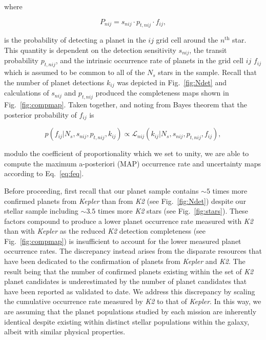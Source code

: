 \documentclass[twocolumn]{emulateapj}
\newcommand{\kepler}[1]{\emph{Kepler}#1}
\newcommand{\ktwo}[1]{\emph{K2}#1}
\begin{document}
\noindent where

\begin{equation}
  P_{nij} = s_{nij} \cdot p_{t,nij} \cdot f_{ij},
  \label{eq:prob}
\end{equation}

\noindent is the probability of detecting a planet in the $ij$ grid cell around the $n^{\text{th}}$ star.
This quantity is dependent on the detection sensitivity $s_{nij}$, the transit probability $p_{t,nij}$, and the 
intrinsic occurrence rate of planets in the grid cell $ij$ $f_{ij}$ which is assumed to be common to all
of the $N_s$ stars in the sample.
Recall that the number of planet detections $k_{ij}$ was depicted in Fig.~\ref{fig:Ndet} and
calculations of $s_{nij}$ and $p_{t,nij}$ produced the completeness maps shown in Fig.~\ref{fig:compmap}. 
Taken together, and noting from Bayes theorem that the posterior probability of $f_{ij}$ is 

\begin{equation}
  p(f_{ij}|N_s,s_{nij},p_{t,nij},k_{ij}) \propto \mathcal{L}_{nij}(k_{ij}|N_s,s_{nij},p_{t,nij},f_{ij}),
  \label{eq:feq}
\end{equation}
  
\noindent modulo the coefficient of proportionality which we set to unity, we are able to compute
the maximum a-posteriori (MAP) occurrence rate and uncertainty maps according to Eq.~\ref{eq:feq}.

Before proceeding, first recall that our planet sample contains $\sim 5$ times more confirmed planets
from \kepler{} than from \ktwo{} 
(see Fig.~\ref{fig:Ndet}) despite our stellar sample including $\sim 3.5$ times more \ktwo{} stars 
(see Fig.~\ref{fig:stars}). These factors compound to produce a lower planet occurrence rate measured
with \ktwo{} than with \kepler{} as the reduced \ktwo{} detection completeness %
(see Fig.~\ref{fig:compmap}) is insufficient to account for the lower measured
planet occurrence rates. The discrepancy instead arises from the disparate resources that have
been dedicated to the confirmation of planets from \kepler{} and \ktwo{.} The result being that
the number of confirmed planets existing within the set of \ktwo{} planet candidates is underestimated
by the number of planet candidates that have been reported as validated to date. We address this discrepancy
by scaling the cumulative occurrence rate measured by \ktwo{} to that of \kepler{.}
In this way, we are assuming that the planet populations studied by each mission are inherently
identical despite existing within distinct stellar populations within the galaxy, albeit with similar
physical properties.
\end{document}

